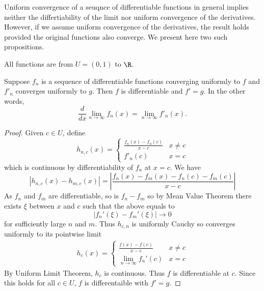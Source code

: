 \documentclass[a4paper]{article}
\begin{document}
\maketitle

Uniform convergence of a seuqnce of differentiable functions in general implies neither the differtiability of the limit nor uniform convergence of the derivatives. However, if we assume uniform convergence of the derivatives, the result holds provided the original functions also converge. We present here two such propositions.

All functions are from \(U = (0, 1)\) to \(\R\).

\begin{proposition}
  Suppose \(f_n\) is a sequence of differentiable functions converging uniformly to \(f\) and \(f'_n\) converges uniformly to \(g\). Then \(f\) is differentiable and \(f' = g\). In the other words,
  \[
    \frac{d}{dx} \lim_{n \to \infty} f_n(x) = \lim_{n \to \infty} f'_n(x).
  \]
\end{proposition}

\begin{proof}
  Given \(c \in U\), define
  \[
    h_{n, c}(x) =
    \begin{cases}
      \frac{f_n(x) - f_n(c)}{x - c} & x \neq c \\
      f'_n(c) & x = c
    \end{cases}
  \]
  which is continuous by differentiability of \(f_n\) at \(x = c\). We have
  \[
    |h_{n, c}(x) - h_{m, c}(x)|
    = \left| \frac{f_n(x) - f_m(x) - f_n(c) - f_m(c)}{x - c} \right|
  \]
  As \(f_n\) and \(f_m\) are differentiable, so is \(f_n - f_m\) so by Mean Value Theorem there exists \(\xi\) between \(x\) and \(c\) such that the above equals to
  \[
    |f_n'(\xi) - f_m'(\xi)| \to 0
  \]
  for sufficiently large \(n\) and \(m\). Thus \(h_{c, n}\) is uniformly Cauchy so converges uniformly to its pointwise limit
  \begin{align*}
    h_c(x) =
    \begin{cases}
      \frac{f(x) - f(c)}{x - c} & x \neq c \\
      \lim_{n \to \infty} f_n'(c) & x = c
    \end{cases}
  \end{align*}
  By Uniform Limit Theorem, \(h_c\) is continuous. Thus \(f\) is differentiable at \(c\). Since this holds for all \(c \in U\), \(f\) is differentaible with \(f' = g\).
\end{proof}
\end{document}
